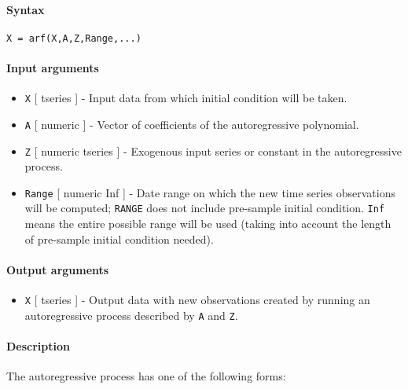 


	\paragraph{Syntax}

\begin{verbatim}
X = arf(X,A,Z,Range,...)
\end{verbatim}

\paragraph{Input arguments}

\begin{itemize}
\item
  \texttt{X} {[} tseries {]} - Input data from which initial condition
  will be taken.
\item
  \texttt{A} {[} numeric {]} - Vector of coefficients of the
  autoregressive polynomial.
\item
  \texttt{Z} {[} numeric \textbar{} tseries {]} - Exogenous input series
  or constant in the autoregressive process.
\item
  \texttt{Range} {[} numeric \textbar{} Inf {]} - Date range on which
  the new time series observations will be computed; \texttt{RANGE} does
  not include pre-sample initial condition. \texttt{Inf} means the
  entire possible range will be used (taking into account the length of
  pre-sample initial condition needed).
\end{itemize}

\paragraph{Output arguments}

\begin{itemize}
\itemsep1pt\parskip0pt
\item
  \texttt{X} {[} tseries {]} - Output data with new observations created
  by running an autoregressive process described by \texttt{A} and
  \texttt{Z}.
\end{itemize}

\paragraph{Description}

The autoregressive process has one of the following forms:

